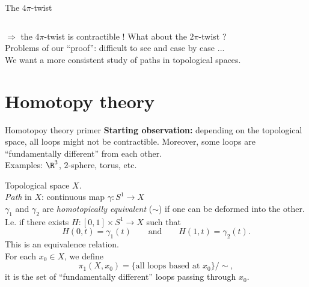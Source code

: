 \documentclass[10pt]{beamer}
\renewcommand{\emph}{\alert}
\begin{document}
\begin{frame}{The $4\pi$-twist}
\begin{center}
\begin{tabular}{m{2cm} m{0.5cm} m{2cm} m{0.5cm} m{2cm}}
        \end{tabular}
    \end{center}
    $\Rightarrow$ the $4\pi$-twist is \emph{contractible} ! What about the $2\pi$-twist ?\\[0.2cm]
    Problems of our ``proof'': \emph{difficult} to see and \emph{case by case} ...\\[0.2cm]
    We want a more consistent study of paths in topological spaces.
\end{frame}

\section{Homotopy theory}

\begin{frame}{Homotopoy theory primer}
    \textbf{Starting observation:} depending on the topological space, all loops might not be contractible. Moreover, some loops are ``fundamentally different'' from each other.\\
    Examples: $\R^3$, $2$-sphere, torus, etc.

    Topological space $X$.\\[0.2cm]

    \textit{Path} in $X$: continuous map $\gamma:S^1\to X$\\[0.2cm]

    $\gamma_1$ and $\gamma_2$ are \textit{homotopically equivalent} ($\sim$) if one can be deformed into the other. I.e. if there exists
    $H:[0,1]\times S^1\to X$ such that
    \begin{equation*}
        H(0,t)=\gamma_1(t)\qquad \text{and}\qquad H(1,t)=\gamma_2(t).
    \end{equation*}
    This is an equivalence relation.\\[0.2cm]
    
    For each $x_0\in X$, we define
    \begin{equation*}
        \pi_1(X,x_0) = \{\text{all loops based at }x_0\}/\sim,
    \end{equation*}
    it is the set of ``fundamentally different'' loops passing through $x_0$.
\end{frame}
\end{document}
